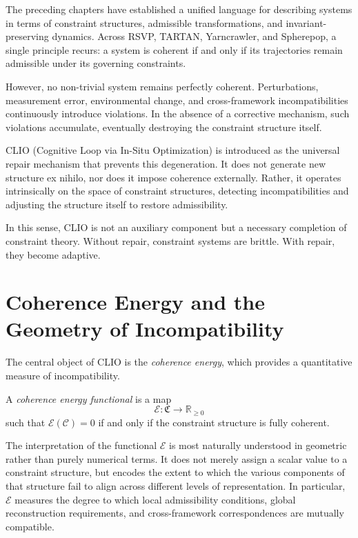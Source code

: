 \documentclass[11pt,openany]{book}
\begin{document}
The preceding chapters have established a unified language
for describing systems in terms of constraint structures,
admissible transformations, and invariant-preserving
dynamics.  Across RSVP, TARTAN, Yarncrawler, and Spherepop,
a single principle recurs: a system is coherent if and only
if its trajectories remain admissible under its governing
constraints.

However, no non-trivial system remains perfectly coherent.
Perturbations, measurement error, environmental change, and
cross-framework incompatibilities continuously introduce
violations.  In the absence of a corrective mechanism, such
violations accumulate, eventually destroying the constraint
structure itself.

CLIO (Cognitive Loop via In-Situ Optimization) is introduced
as the universal repair mechanism that prevents this
degeneration.  It does not generate new structure ex nihilo,
nor does it impose coherence externally.  Rather, it operates
intrinsically on the space of constraint structures,
detecting incompatibilities and adjusting the structure
itself to restore admissibility.

In this sense, CLIO is not an auxiliary component but a
necessary completion of constraint theory.  Without repair,
constraint systems are brittle.  With repair, they become
adaptive.

\section{Coherence Energy and the Geometry of Incompatibility}
\label{sec:energy}

The central object of CLIO is the \emph{coherence energy},
which provides a quantitative measure of incompatibility.

\begin{definition}
\label{def:coherence-energy}
A \emph{coherence energy functional} is a map
\[
\mathcal{E} : \mathfrak{C} \to \mathbb{R}_{\ge 0}
\]
such that $\mathcal{E}(\mathcal{C}) = 0$ if and only if
the constraint structure is fully coherent.
\end{definition}

The interpretation of the functional $\mathcal{E}$ is most
naturally understood in geometric rather than purely
numerical terms.  It does not merely assign a scalar value
to a constraint structure, but encodes the extent to which
the various components of that structure fail to align
across different levels of representation.  In particular,
$\mathcal{E}$ measures the degree to which local
admissibility conditions, global reconstruction
requirements, and cross-framework correspondences are
mutually compatible.
\end{document}
